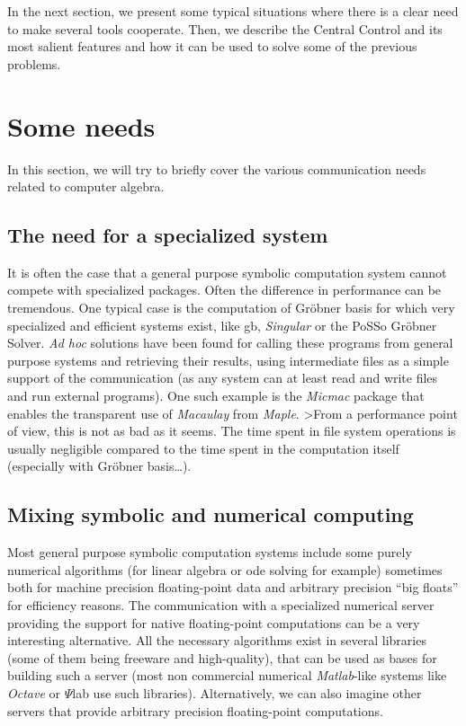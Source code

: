 \documentclass {article}
\begin{document}

In the next section, we present some typical situations where there is a
clear need to make several tools cooperate. Then, we describe the Central
Control and its most salient features and how it can be used to
solve some of the previous problems. 

\section{ Some needs }

In this section, we will try to briefly cover the various communication
needs related to computer algebra.

\subsection*{ The need for a specialized system}

It is often the case that a general purpose symbolic computation system cannot
compete with specialized packages. 
Often the difference in performance can be
tremendous. One typical case is the computation of Gr\"obner basis for which
very specialized and efficient systems exist, like {\sc gb}, 
{\sl Singular} or the PoSSo Gr\"obner Solver.
{\sl Ad hoc} solutions have been  found for calling these programs from
general purpose systems and retrieving their results, using intermediate
files as a simple support of the communication 
(as any system can at least read and write files and run external programs). 
One such example is the {\sl Micmac} package that enables the transparent use
of {\sl Macaulay} from {\sl Maple}.
>From a performance point of view, this is not as bad as it seems. The time
spent in file system operations is usually negligible compared to the time
spent in the computation itself (especially with Gr\"obner basis\ldots).

\subsection*{ Mixing symbolic and numerical computing}

Most general purpose symbolic computation systems include some purely
numerical algorithms (for linear algebra or {\sc ode} solving for example)
sometimes both for machine precision floating-point data  and arbitrary
precision ``big floats'' for efficiency reasons. 
The communication with a specialized numerical server providing the support
for native floating-point computations can be a very interesting alternative.
All the necessary algorithms exist in several libraries (some of them being
freeware and high-quality), that can be used as bases for building such a
server (most non commercial numerical {\sl Matlab}-like systems like {\sl
Octave} or $\Psi$lab use such libraries).
Alternatively, we can also imagine other servers that provide arbitrary
precision floating-point computations.
\end{document}
